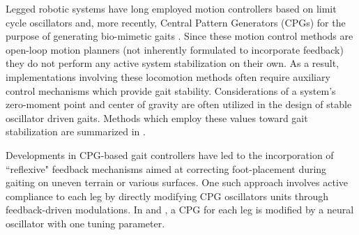 
Legged robotic systems have long employed motion controllers based on limit cycle oscillators and, more recently, 
Central Pattern Generators (CPGs)  for the purpose of generating bio-mimetic gaits 
\cite{Matsuoka1985,Collins1993,Endo2004,Righetti2006,Ijspeert2008,Matos2010,Ajallooeian2013,Park2014,Fukuoka2015}. 
Since these motion control methods are open-loop motion planners (\IE not inherently formulated to incorporate feedback) 
they do not perform any active system stabilization on their own. As a result, implementations involving these  
locomotion methods often require auxiliary control mechanisms which provide gait stability. Considerations of a system's zero-moment point and center of gravity are often utilized in the design of stable oscillator driven gaits. Methods which employ these values toward gait stabilization are summarized in \cite{Wieber2015}. %

Developments in CPG-based gait controllers have led to the incorporation of ``reflexive" feedback
mechanisms aimed at correcting foot-placement during gaiting on uneven terrain or various surfaces. One such approach
involves active compliance to each leg by directly modifying CPG oscillators units through feedback-driven 
modulations. In  \cite{Fukuoka2003} and \cite{Endo2004}, a CPG for each leg is modified by a neural oscillator 
with one tuning parameter.  


